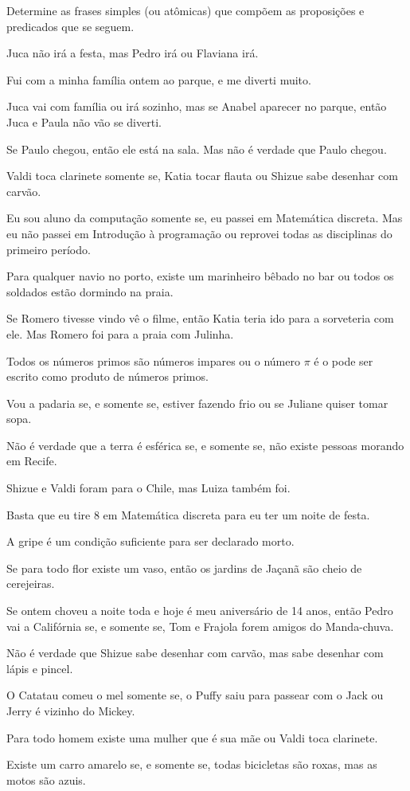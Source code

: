 \begin{problem}
	Determine as frases simples (ou atômicas) que compõem as proposições e predicados que se seguem.
\end{problem}

\begin{exerList}
	\item Juca não irá a festa, mas Pedro irá ou Flaviana irá.
	\item Fui com a minha família ontem ao parque, e me diverti muito.
	\item Juca vai com família ou irá sozinho, mas se Anabel aparecer no parque, então Juca e Paula não vão se diverti.
	\item Se Paulo chegou, então ele está na sala. Mas não é verdade que Paulo chegou.
	\item Valdi toca clarinete somente se, Katia tocar flauta ou Shizue sabe desenhar com carvão.
	\item Eu sou aluno da computação somente se, eu passei em Matemática discreta. Mas eu não passei em Introdução à programação ou reprovei todas as disciplinas do primeiro período.
	\item Para qualquer navio no porto, existe um marinheiro bêbado no bar ou todos os soldados estão dormindo na praia.
	\item Se Romero tivesse vindo vê o filme, então Katia teria ido para a sorveteria com ele. Mas Romero foi para a praia com Julinha.
	\item Todos os números primos são números impares ou o número $\pi$ é o pode ser escrito como produto de números primos.
	\item Vou a padaria se, e somente se, estiver fazendo frio ou se Juliane quiser tomar sopa.
	\item Não é verdade que a terra é esférica se, e somente se, não existe pessoas morando em Recife.
	\item Shizue e Valdi foram para o Chile, mas Luiza também foi.
	\item Basta que eu tire 8 em Matemática discreta para eu ter um noite de festa.
	\item A gripe é um condição suficiente para ser declarado morto.
	\item Se para todo flor existe um vaso, então os jardins de Jaçanã são cheio de cerejeiras. 
	\item Se ontem choveu a noite toda e hoje é meu aniversário de 14 anos, então Pedro vai a Califórnia se, e somente se, Tom e Frajola forem amigos do Manda-chuva.
	\item Não é verdade que Shizue sabe desenhar com carvão, mas sabe desenhar com lápis e pincel.
	\item O Catatau comeu o mel somente se, o Puffy saiu para passear com o Jack ou Jerry é vizinho do Mickey.
	\item Para todo homem existe uma mulher que é sua mãe ou Valdi toca clarinete.
	\item Existe um carro amarelo se, e somente se, todas bicicletas são roxas, mas as motos são azuis. 
\end{exerList}